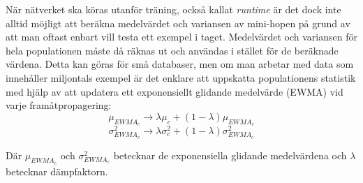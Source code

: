 \documentclass[a4paper,11pt,twoside]{article}
\begin{document}
När nätverket ska köras utanför träning, också kallat \textit{runtime} är det dock inte alltid möjligt att beräkna medelvärdet och variansen av mini-hopen på grund av att man oftast enbart vill testa ett exempel i taget. Medelvärdet och variansen för hela populationen måste då räknas ut och användas i stället för de beräknade värdena. Detta kan göras för små databaser, men om man arbetar med data som innehåller miljontals exempel är det enklare att uppskatta populationens statistik med hjälp av att updatera ett exponensiellt glidande medelvärde (EWMA) vid varje framåtpropagering: \cite{cs231n} \cite{batchnorm}
\begin{equation}
\mu_{EWMA_c} \to \lambda \mu_c + (1-\lambda)\mu_{EWMA_c}
\end{equation}
\begin{equation}
\sigma^2_{EWMA_c} \to \lambda \sigma^2_c + (1-\lambda)\sigma^2_{EWMA_c}
\end{equation}

Där $\mu_{EWMA_c}$ och $\sigma^2_{EWMA_c}$ betecknar de exponensiella glidande medelvärdena och $\lambda$ betecknar dämpfaktorn.
\end{document}
